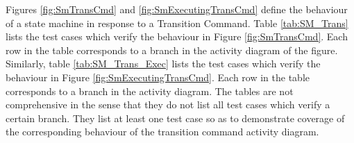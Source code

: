 \documentclass[requirements]{../fwprofile}
\begin{document}
\label{Appendix_D_SM_Trans}
Figures \ref{fig:SmTransCmd} and \ref{fig:SmExecutingTransCmd} define the behaviour 
of a state machine in response to a Transition Command. 
Table \ref{tab:SM_Trans} lists the test cases which verify the behaviour in Figure 
\ref{fig:SmTransCmd}.
Each row in the table corresponds to a branch in the  activity diagram of the figure. 
Similarly, table \ref{tab:SM_Trans_Exec} lists the test cases which verify the behaviour 
in Figure \ref{fig:SmExecutingTransCmd}. 
Each row in the table corresponds to a branch in the activity diagram. 
The tables are not comprehensive in the sense that they do not list all test cases 
which verify a certain branch. 
They list at least one test case so as to demonstrate coverage of the corresponding 
behaviour of the transition command activity diagram.
\end{document}
